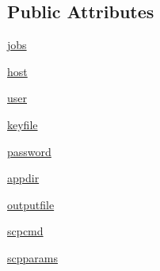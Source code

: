 \subsection*{\-Public \-Attributes}
\begin{DoxyCompactItemize}
\item 
\hyperlink{classcyberweb_1_1lib_1_1jodis_1_1sshresource_1_1basessh_a98d973ceae1a11ebfa89eb1177d68e2b}{jobs}
\item 
\hyperlink{classcyberweb_1_1lib_1_1jodis_1_1sshresource_1_1basessh_a26e84e2ea0e823170f4057167f9180a3}{host}
\item 
\hyperlink{classcyberweb_1_1lib_1_1jodis_1_1sshresource_1_1basessh_a3f75f9d36a542476a4196051560bcc35}{user}
\item 
\hyperlink{classcyberweb_1_1lib_1_1jodis_1_1sshresource_1_1basessh_a24670dbed05cdd8b05c9a70828ea9bb6}{keyfile}
\item 
\hyperlink{classcyberweb_1_1lib_1_1jodis_1_1sshresource_1_1basessh_a032c71aee36b0b86420d1989278454b8}{password}
\item 
\hyperlink{classcyberweb_1_1lib_1_1jodis_1_1sshresource_1_1basessh_a4894be93f398439d1375de993fb39d71}{appdir}
\item 
\hyperlink{classcyberweb_1_1lib_1_1jodis_1_1sshresource_1_1basessh_a704fd83023c992498f7f0db69d19fe72}{outputfile}
\item 
\hyperlink{classcyberweb_1_1lib_1_1jodis_1_1sshresource_1_1basessh_aab81049d260269ca5c54b85952178ac7}{scpcmd}
\item 
\hyperlink{classcyberweb_1_1lib_1_1jodis_1_1sshresource_1_1basessh_a23afa8dffd0f659506a2bd3a9761c1fc}{scpparams}
\end{DoxyCompactItemize}


